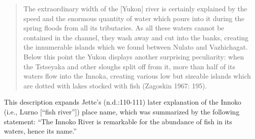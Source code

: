 \begin{quote}
    The extraordinary width of the [Yukon] river is certainly explained by the speed and the enormous quantity of water which pours into it during the spring floods from all its tributaries. As all these waters cannot be contained in the channel, they wash away and cut into the banks, creating the innumerable islands which we found between Nulato and Vazhichagat. Below this point the Yukon displays another surprising peculiarity: when the Tstseyaka and other sloughs split off from it, more than half of its waters flow into the Innoka, creating various low but sizeable islands which are dotted with lakes stocked with fish (Zagoskin 1967: 195).
\end{quote}
\noindent
This description expands Jette’s (n.d.:110-111) later explanation of the Innoko (i.e., Lurno [“fish river”]) place name, which was summarized by the following statement: “The Innoko River is remarkable for the abundance of fish in its waters, hence its name.”

